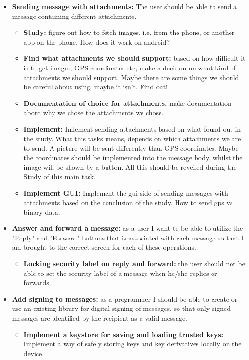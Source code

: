 \begin{itemize}
\begin{itemize}
\end{itemize}
\item{}\textbf{Sending message with attachments:} The user should be able to send a message containing different attachments.
\begin{itemize}
\item{}\textbf{Study:} figure out how to fetch images, i.e. from the phone, or another app on the phone. How does it work on android?
\item{}\textbf{Find what attachments we should support:} based on how difficult it is to get images, GPS coordinates etc, make a decision on what kind of attachments we should support. Maybe there are some things we should be careful about using, maybe it isn't. Find out!
\item{}\textbf{Documentation of choice for attachments:} make documentation about why we chose the attachments we chose.
\item{}\textbf{Implement:} Imlement sending attachments based on what found out in the study. What this tasks means, depends on which attachments we are to send. A picture will be sent differently than GPS coordinates. Maybe the coordinates should be implemented into the message body, whilst the image will be shown by a button. All this should be reveiled during the Study of this main task. 
\item{}\textbf{Implement GUI:} Implement the gui-side of sending messages with attachments based on the conclusion of the study. How to send gps vs binary data.
\end{itemize}
\item{}\textbf{Answer and forward a message:} as a user I want to be able to utilize the "Reply" and "Forward" buttons that is associated with each message so that I am brought to the correct screen for each of these operations.
\begin{itemize}
\item{}\textbf{Locking security label on reply and forward:} the user should not be able to set the security label of a message when he/she replies or forwards.
\end{itemize}
\item{}\textbf{Add signing to messages:} as a programmer I should be able to create or use an existing library for digital signing of messages, so that only signed messages are identified by the recipient as a valid message.
\begin{itemize}
\item{}\textbf{Implement a keystore for saving and loading trusted keys:} Implement a way of safely storing keys and key derivatives locally on the device. 

\end{itemize}
\end{itemize}
